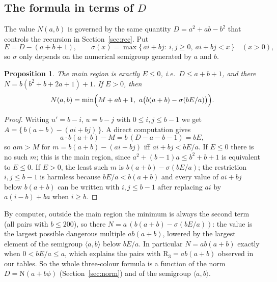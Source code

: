 \documentclass[11pt,a4paper]{article}
\newtheorem{proposition}[theorem]{Proposition}
\theoremstyle{definition}
\theoremstyle{remark}
\newcommand{\R}{\mathrm{R}}
\begin{document}
\subsection{The formula in terms of \texorpdfstring{$D$}{D}}\label{sec:NinD}
The value $N(a,b)$ is governed by the same quantity $D=a^2+ab-b^2$ that controls the recursion in Section~\ref{sec:rec}. Put
\[
  E=D-(a+b+1),\qquad
  \sigma(x)=\max\{\,ai+bj:\ i,j\ge0,\ ai+bj<x\,\}\quad(x>0),
\]
so $\sigma$ only depends on the numerical semigroup generated by $a$ and $b$.
\begin{proposition}\label{prop:NinD}
The main region is exactly $E\le0$, i.e.\ $D\le a+b+1$, and there $N=b(b^2+b+2a+1)+1$. If $E>0$, then
\[
  N(a,b)=\min\Bigl(M+ab+1,\ a\bigl(b(a+b)-\sigma(bE/a)\bigr)\Bigr).
\]
\end{proposition}
\begin{proof}
Writing $u'=b-i$, $u=b-j$ with $0\le i,j\le b-1$ we get $A=\{\,b(a+b)-(ai+bj)\,\}$. A direct computation gives
\[
  a\cdot b(a+b)-M=b\,(D-a-b-1)=bE ,
\]
so $am>M$ for $m=b(a+b)-(ai+bj)$ iff $ai+bj<bE/a$. If $E\le0$ there is no such $m$; this is the main region, since $a^2+(b-1)a\le b^2+b+1$ is equivalent to $E\le0$. If $E>0$, the least such $m$ is $b(a+b)-\sigma(bE/a)$; the restriction $i,j\le b-1$ is harmless because $bE/a<b(a+b)$ and every value of $ai+bj$ below $b(a+b)$ can be written with $i,j\le b-1$ after replacing $ai$ by $a(i-b)+ba$ when $i\ge b$.
\end{proof}
By computer, outside the main region the minimum is always the second term (all pairs with $b\le200$), so there $N=a\,(b(a+b)-\sigma(bE/a))$: the value is the largest possible dangerous multiple $ab(a+b)$, lowered by the largest element of the semigroup $\langle a,b\rangle$ below $bE/a$. In particular $N=ab(a+b)$ exactly when $0<bE/a\le a$, which explains the pairs with $\R_3=ab(a+b)$ observed in our tables. So the whole three-colour formula is a function of the norm $D=\mathrm N(a+b\phi)$ (Section~\ref{sec:norm}) and of the semigroup $\langle a,b\rangle$.
\end{document}
